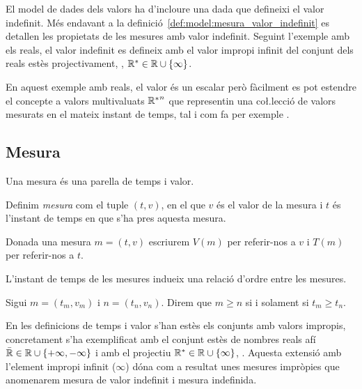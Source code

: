 

El model de dades dels valors ha d'incloure una dada que defineixi el
valor indefinit. Més endavant a la
definició~\ref{def:model:mesura_valor_indefinit} es detallen les
propietats de les mesures amb valor indefinit. Seguint l'exemple amb
els reals, el valor indefinit es defineix amb el valor impropi infinit
del conjunt dels reals estès
projectivament, \parencite{cantrell:projectivelyextendedreal},
$\mathbb{R}{}^*\in\mathbb{R}{} \cup \{\infty\}$.


En aquest exemple amb reals, el valor és un escalar però fàcilment es
pot estendre el concepte a valors multivaluats ${\mathbb{R}{}^*}^n$ que
representin una co\l.lecció de valors mesurats en el mateix instant de
temps, tal i com fa per exemple \textcite{assfalg08:thesis}.







\subsection{Mesura}\label{sec:model:mesura} 

Una mesura és una parella de temps i valor.

\begin{definition}[Mesura]
  \label{def:model:mesura}
  Definim \emph{mesura} com el tuple $(t,v)$, en el que $v$ és el
  valor de la mesura i $t$ és l'instant de temps en que s'ha pres
  aquesta mesura.
\end{definition}


Donada una mesura $m=(t,v)$ escriurem $V(m)$ per referir-nos a $v$ i
$T(m)$ per referir-nos a $t$.

L'instant de temps de les mesures indueix una relació d'ordre entre
les mesures.
\begin{definition}
  \label{def:model:mesura-relacio-ordre}
  Sigui $m=(t_m,v_m)$ i $n=(t_n,v_n)$. Direm que $m\geq n$ si i solament
  si $t_m\geq t_n$.
\end{definition}


En les definicions de temps i valor s'han estès els conjunts amb
valors impropis, concretament s'ha exemplificat amb el conjunt estès
de nombres reals afí $\bar{\mathbb{R}{}} \in \mathbb{R}{} \cup
\{+\infty,-\infty\}$ i amb el projectiu $\mathbb{R}{}^*\in\mathbb{R}{}
\cup\{\infty\}$,
\parencite{cantrell:extendedreal,cantrell:projectivelyextendedreal}. Aquesta
extensió amb l'element impropi infinit ($\infty$) dóna com a resultat
unes mesures impròpies que anomenarem mesura de valor indefinit i
mesura indefinida.

